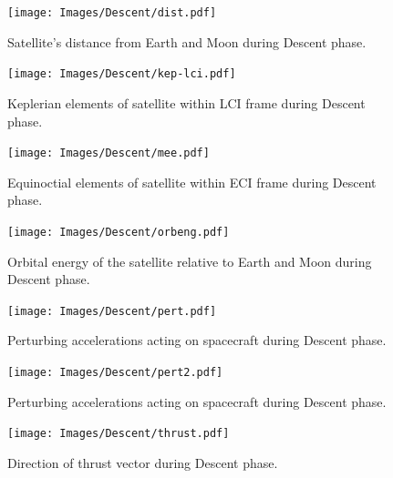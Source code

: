 \begin{figure}
\begin{center}
\texttt{[image: Images/Descent/dist.pdf]}
\end{center}
\caption{Satellite's distance from Earth and Moon during Descent phase.}
\label{fig:Descent-dist}
\end{figure}

\begin{figure}
\begin{center}
\texttt{[image: Images/Descent/kep-lci.pdf]}
\end{center}
\caption{Keplerian elements of satellite within LCI frame during Descent phase.}
\label{fig:Descent-kep-lci}
\end{figure}

\begin{figure}
\begin{center}
\texttt{[image: Images/Descent/mee.pdf]}
\end{center}
\caption{Equinoctial elements of satellite within ECI frame during Descent phase.}
\label{fig:Descent-mee}
\end{figure}

\begin{figure}
\begin{center}
\texttt{[image: Images/Descent/orbeng.pdf]}
\end{center}
\caption{Orbital energy of the satellite relative to Earth and Moon during Descent phase.}
\label{fig:Descent-orbeng}
\end{figure}

\begin{figure}
\begin{center}
\texttt{[image: Images/Descent/pert.pdf]}
\end{center}
\caption{Perturbing accelerations acting on spacecraft during Descent phase.}
\label{fig:Descent-pert}
\end{figure}

\begin{figure}
\begin{center}
\texttt{[image: Images/Descent/pert2.pdf]}
\end{center}
\caption{Perturbing accelerations acting on spacecraft during Descent phase.}
\label{fig:Descent-pert2}
\end{figure}

\begin{figure}
\begin{center}
\texttt{[image: Images/Descent/thrust.pdf]}
\end{center}
\caption{Direction of thrust vector during Descent phase.}
\label{fig:Descent-thrust}
\end{figure}

